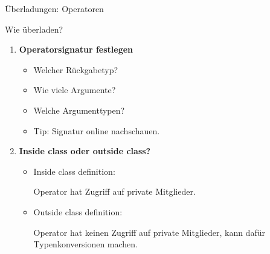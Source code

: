 \ifnum\conditionmacro=1 \documentclass[handout,usenames,dvipsnames]{beamer}\fi
\begin{document}
\begin{frame}[label=BHowToOverload]{Überladungen: Operatoren}
\begin{block}{Wie überladen?}
\begin{enumerate}
\item \textbf{Operatorsignatur festlegen}
\begin{itemize}
\item Welcher Rückgabetyp?
\item Wie viele Argumente?
\item Welche Argumenttypen?
\item Tip: Signatur online nachschauen.
\end{itemize}
\item \textbf{Inside class oder outside class?}
\begin{itemize}
\item Inside class definition: 

Operator hat Zugriff auf private Mitglieder.
\item Outside class definition: 

Operator hat keinen Zugriff auf private Mitglieder, kann dafür Typenkonversionen machen. 
\end{itemize}
\end{enumerate}
\end{block}

\vfill

\hyperlink{POperatorOverloading}{}

\end{frame}

\end{document}
